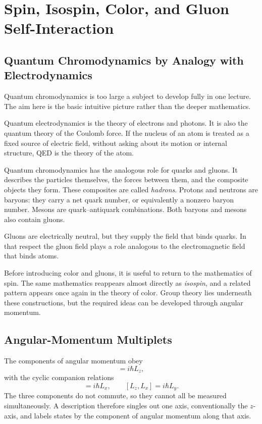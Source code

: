 \chapter{Spin, Isospin, Color, and Gluon Self-Interaction}

\section{Quantum Chromodynamics by Analogy with Electrodynamics}

Quantum chromodynamics is too large a subject to develop fully in one lecture. The aim here is the basic intuitive picture rather than the deeper mathematics.

Quantum electrodynamics is the theory of electrons and photons. It is also the quantum theory of the Coulomb force. If the nucleus of an atom is treated as a fixed source of electric field, without asking about its motion or internal structure, QED is the theory of the atom.

Quantum chromodynamics has the analogous role for quarks and gluons. It describes the particles themselves, the forces between them, and the composite objects they form. These composites are called \emph{hadrons}. Protons and neutrons are baryons: they carry a net quark number, or equivalently a nonzero baryon number. Mesons are quark--antiquark combinations. Both baryons and mesons also contain gluons.

Gluons are electrically neutral, but they supply the field that binds quarks. In that respect the gluon field plays a role analogous to the electromagnetic field that binds atoms.

Before introducing color and gluons, it is useful to return to the mathematics of spin. The same mathematics reappears almost directly as \emph{isospin}, and a related pattern appears once again in the theory of color. Group theory lies underneath these constructions, but the required ideas can be developed through angular momentum.

\section{Angular-Momentum Multiplets}

The components of angular momentum obey
\begin{equation}
[L_x,L_y]=i\hbar L_z,
\end{equation}
with the cyclic companion relations
\begin{equation}
[L_y,L_z]=i\hbar L_x,
\qquad
[L_z,L_x]=i\hbar L_y.
\end{equation}
The three components do not commute, so they cannot all be measured simultaneously. A description therefore singles out one axis, conventionally the \(z\)-axis, and labels states by the component of angular momentum along that axis.

